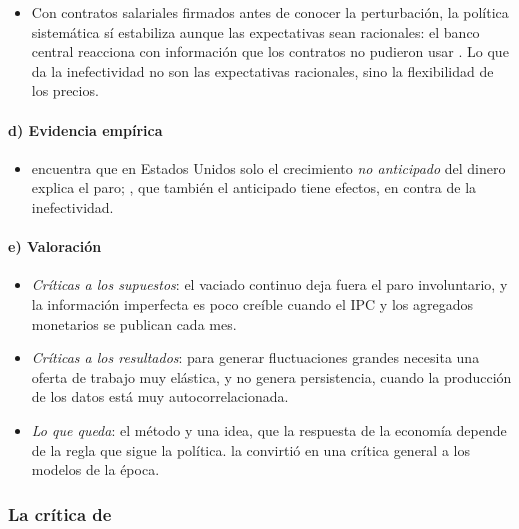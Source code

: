 \documentclass[11pt]{article}
\begin{document}
\begin{itemize}
\item Con contratos salariales firmados antes de conocer la perturbación, la política sistemática sí estabiliza aunque las expectativas sean racionales: el banco central reacciona con información que los contratos no pudieron usar\nocite{Fischer1977Long,Taylor1980Aggregate}  . Lo que da la inefectividad no son las expectativas racionales, sino la flexibilidad de los precios.
\end{itemize}

\paragraph{d) Evidencia empírica}

\begin{itemize}
\item \textcite{Barro1977Unanticipated} encuentra que en Estados Unidos solo el crecimiento \emph{no anticipado} del dinero explica el paro; \textcite{Mishkin1982Does}, que también el anticipado tiene efectos, en contra de la inefectividad.
\end{itemize}

\paragraph{e) Valoración}

\begin{itemize}
\item \emph{Críticas a los supuestos}: el vaciado continuo deja fuera el paro involuntario, y la información imperfecta es poco creíble cuando el IPC y los agregados monetarios se publican cada mes.
\item \emph{Críticas a los resultados}: para generar fluctuaciones grandes necesita una oferta de trabajo muy elástica, y no genera persistencia, cuando la producción de los datos está muy autocorrelacionada.
\item \emph{Lo que queda}: el método y una idea, que la respuesta de la economía depende de la regla que sigue la política.  la convirtió en una crítica general a los modelos de la época.
\end{itemize}

\subsubsection{La crítica de }\label{sec:critica-lucas}
\end{document}
